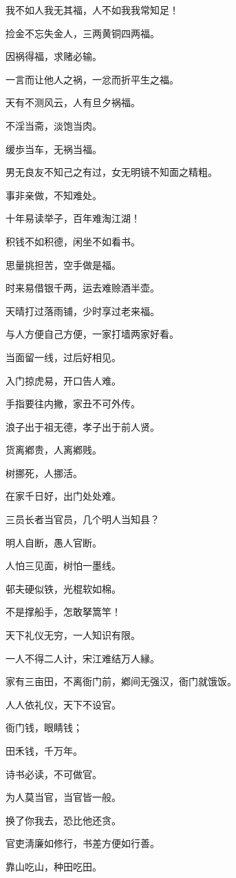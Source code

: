 \documentclass[12pt,oneside]{book}
\begin{document}
我不如人我无其福，人不如我我常知足！

捡金不忘失金人，三两黄铜四两福。

因祸得福，求赌必输。

一言而让他人之祸，一忿而折平生之福。

天有不测风云，人有旦夕祸福。

不淫当斋，淡饱当肉。

缓歩当车，无祸当福。

男无良友不知己之有过，女无明镜不知面之精粗。

事非亲做，不知难处。

十年易读举子，百年难淘江湖！

积钱不如积德，闲坐不如看书。

思量挑担苦，空手做是福。

时来易借银千两，运去难赊酒半壶。

天晴打过落雨铺，少时享过老来福。

与人方便自己方便，一家打墙两家好看。

当面留一线，过后好相见。

入门掠虎易，开口告人难。

手指要往内撇，家丑不可外传。

浪子出于祖无德，孝子出于前人贤。

货离鄕贵，人离鄕贱。

树挪死，人挪活。

在家千日好，出门处处难。

三员长者当官员，几个明人当知县？

明人自断，愚人官断。

人怕三见面，树怕一墨线。

邨夫硬似铁，光棍软如棉。

不是撑船手，怎敢拏篙竿！

天下礼仪无穷，一人知识有限。

一人不得二人计，宋江难结万人縁。

家有三亩田，不离衙门前，鄕间无强汉，衙门就饿饭。

人人依礼仪，天下不设官。

衙门钱，眼睛钱；

田禾钱，千万年。

诗书必读，不可做官。

为人莫当官，当官皆一般。

换了你我去，恐比他还贪。

官吏淸廉如修行，书差方便如行善。

靠山吃山，种田吃田。
\end{document}
